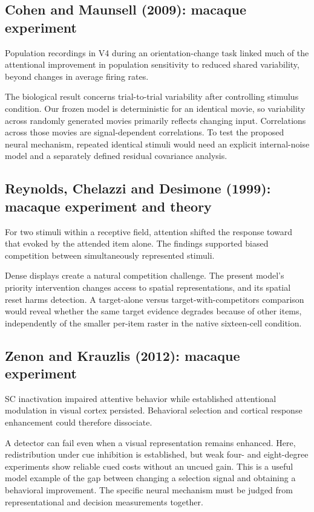 \documentclass[11pt]{article}
\begin{document}
\subsection{Cohen and Maunsell (2009): macaque experiment}
Population recordings in V4 during an orientation-change task linked much of the attentional improvement in population sensitivity to reduced shared variability, beyond changes in average firing rates. \cite{bio_cohen}

The biological result concerns trial-to-trial variability after controlling stimulus condition. Our frozen model is deterministic for an identical movie, so variability across randomly generated movies primarily reflects changing input. Correlations across those movies are signal-dependent correlations. To test the proposed neural mechanism, repeated identical stimuli would need an explicit internal-noise model and a separately defined residual covariance analysis.

\subsection{Reynolds, Chelazzi and Desimone (1999): macaque experiment and theory}
For two stimuli within a receptive field, attention shifted the response toward that evoked by the attended item alone. The findings supported biased competition between simultaneously represented stimuli. \cite{bio_competition}

Dense displays create a natural competition challenge. The present model’s priority intervention changes access to spatial representations, and its spatial reset harms detection. A target-alone versus target-with-competitors comparison would reveal whether the same target evidence degrades because of other items, independently of the smaller per-item raster in the native sixteen-cell condition.

\subsection{Zenon and Krauzlis (2012): macaque experiment}
SC inactivation impaired attentive behavior while established attentional modulation in visual cortex persisted. Behavioral selection and cortical response enhancement could therefore dissociate. \cite{bio_zenon}

A detector can fail even when a visual representation remains enhanced. Here, redistribution under cue inhibition is established, but weak four- and eight-degree experiments show reliable cued costs without an uncued gain. This is a useful model example of the gap between changing a selection signal and obtaining a behavioral improvement. The specific neural mechanism must be judged from representational and decision measurements together.
\end{document}
